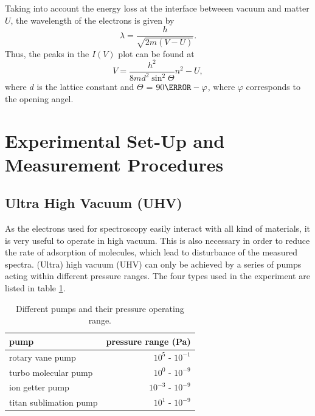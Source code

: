 \documentclass[a4paper]{scrartcl}
\numberwithin{equation}{section}
\numberwithin{figure}{section}
\numberwithin{table}{section}
\newcommand{\eq}[2]{\begin{equation}#1\label{#2}\end{equation}}
\begin{document}
Taking into account the energy loss at the interface betweeen vacuum and matter $U$, the wavelength of the electrons is given by
\eq{\lambda = \frac{h}{\sqrt{2m(V-U)}}.}{lshift}
Thus, the peaks in the $I(V)$ plot can be found at
\eq{V=\frac{h^2}{8md^2 \sin^2 \Theta }n^2-U,}{eq:iv}
where $d$ is the lattice constant and $\Theta$ = $90\degree - \varphi$, where $\varphi$ corresponds to the opening angel. 

\clearpage
\section{Experimental Set-Up and Measurement Procedures}
\FloatBarrier
\subsection{Ultra High Vacuum (UHV)}
As the electrons used for spectroscopy easily interact with all kind of materials, it is very useful to operate in high vacuum. This is also necessary in order to reduce the rate of adsorption of molecules, which lead to disturbance of the measured spectra. (Ultra) high  vacuum (UHV) can only be achieved by a series of pumps acting within different pressure ranges. The four types used in the experiment are listed in table \ref{tab:pump}.
\begin{table}
\begin{tabular}{lr}
\toprule
pump & pressure range (Pa)\\
\midrule
\small rotary vane pump & $10^5$ - $10^{-1}$  \\ %
\small turbo molecular pump &  $10^0$  - $10^{-9}$  \\
\small ion getter pump  & $ 10^{-3}$  - $10^{-9}$  \\
\small titan sublimation pump & $10^1$  - $10^{-9}$  \\
\bottomrule
\end{tabular}
\caption{Different pumps and their pressure operating range.}
\label{tab:pump}
\end{table}
\end{document}
